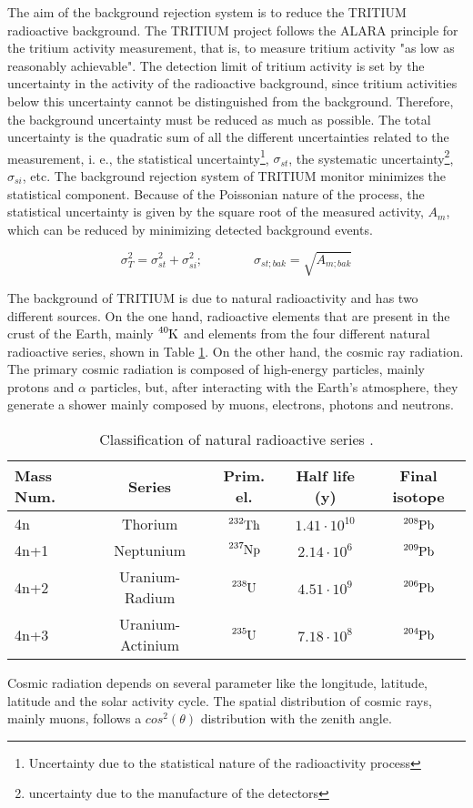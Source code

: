 The aim of the background rejection system is to reduce the TRITIUM radioactive background. The TRITIUM project follows the ALARA principle for the tritium activity measurement, that is, to measure tritium activity "as low as reasonably achievable". The detection limit of tritium activity is set by the uncertainty in the activity of the radioactive background, since tritium activities below this uncertainty cannot be distinguished from the background. Therefore, the background uncertainty must be reduced as much as possible. The total uncertainty is the quadratic sum of all the different uncertainties related to the measurement, i. e., the statistical uncertainty\footnote{Uncertainty due to the statistical nature of the radioactivity process}, $\sigma_{st}$, the systematic uncertainty\footnote{uncertainty due to the manufacture of the detectors}, $\sigma_{si}$, etc. The background rejection system of TRITIUM monitor minimizes the statistical component. Because of the Poissonian nature of the process, the statistical uncertainty is given by the square root of the measured activity, $A_{m}$, which can be reduced by minimizing detected background events.

\begin{equation}
\sigma_{T}^2 = \sigma_{st}^2 +\sigma_{si}^2; \qquad \qquad \sigma_{st;bak} = \sqrt{A_{m;bak}}
\label{eq:SquareSumUncerainty}
\end{equation} 

The background of TRITIUM is due to natural radioactivity and has two different sources. On the one hand, radioactive elements that are present in the crust of the Earth, mainly $\ce{^{40}K}$ and elements from the four different natural radioactive series, shown in Table \ref{tab:NaturalRadioactiveSeries}. On the other hand, the cosmic ray radiation. The primary cosmic radiation is composed of high-energy particles, mainly protons and $\alpha$ particles, but, after interacting with the Earth's atmosphere, they generate a shower mainly composed by muons, electrons, photons and neutrons.

\begin{table}[htbp]
\centering{}%
\begin{tabular}{lcccc}
\toprule 
Mass Num. & Series & Prim. el. & Half life (y) & Final isotope \tabularnewline
\midrule
\midrule 
4n & Thorium & $\ce{^{232}Th}$ & $1.41 \cdot{} 10^{10}$ & $\ce{^{208}Pb}$ \tabularnewline
4n+1 & Neptunium & $\ce{^{237}Np}$ & $2.14 \cdot{} 10^{6}$ & $\ce{^{209}Pb}$ \tabularnewline
4n+2 & Uranium-Radium & $\ce{^{238}U}$ & $4.51 \cdot{} 10^{9}$ & $\ce{^{206}Pb}$ \tabularnewline
4n+3 & Uranium-Actinium & $\ce{^{235}U}$ & $7.18 \cdot{} 10^{8}$ & $\ce{^{204}Pb}$ \tabularnewline
\bottomrule
\end{tabular}
\caption{Classification of natural radioactive series \cite{NaturalRadioactiveSeries1, NaturalRadioactiveSeries2}.}
\label{tab:NaturalRadioactiveSeries}
\end{table}
Cosmic radiation depends on several parameter like the longitude, latitude, latitude and the solar activity cycle. The spatial distribution of cosmic rays, mainly muons, follows a $cos^2(\theta)$ distribution with the zenith angle. 

